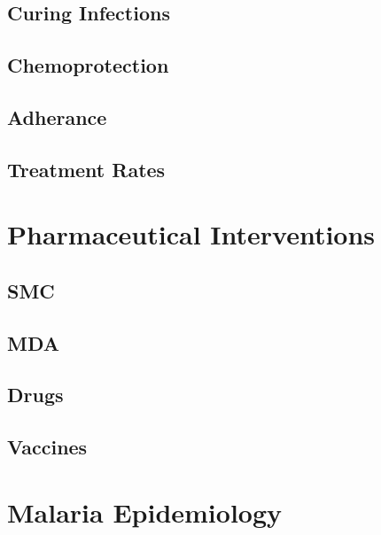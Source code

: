 \documentclass[
]{book}
\begin{document}
\hypertarget{curing-infections}{%
\section{Curing Infections}\label{curing-infections}}

\hypertarget{chemoprotection}{%
\section{Chemoprotection}\label{chemoprotection}}

\hypertarget{adherance}{%
\section{Adherance}\label{adherance}}

\hypertarget{treatment-rates}{%
\section{Treatment Rates}\label{treatment-rates}}

\hypertarget{pharmaceutical-interventions}{%
\chapter{Pharmaceutical Interventions}\label{pharmaceutical-interventions}}

\hypertarget{smc}{%
\section{SMC}\label{smc}}

\hypertarget{mda}{%
\section{MDA}\label{mda}}

\hypertarget{drugs}{%
\section{Drugs}\label{drugs}}

\hypertarget{vaccines}{%
\section{Vaccines}\label{vaccines}}

\hypertarget{malaria-epidemiology}{%
\chapter{Malaria Epidemiology}\label{malaria-epidemiology}}
\end{document}
